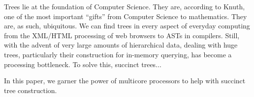 Trees lie at the foundation of Computer Science. They are, according
to Knuth, one of the most important ``gifts'' from Computer Science to
mathematics. They are, as such, ubiquitous. We can find trees in every
aspect of everyday computing from the XML/HTML processing of web
browsers to ASTs in compilers. Still, with the advent of very large
amounts of hierarchical data, dealing with huge trees, particularly
their construction for in-memory querying, has become a processing
bottleneck. To solve this, succinct trees...

In this paper, we garner the power of multicore processors to help
with succinct tree construction.
